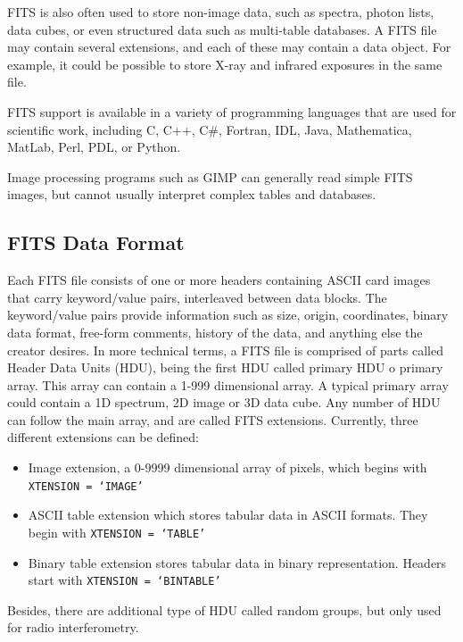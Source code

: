 FITS is also often used to store non-image data, such as spectra, photon lists, data cubes, or even structured data such as multi-table databases. A FITS file may contain several extensions, and each of these may contain a data object. For example, it
could be %
possible to store
X-ray %
and infrared exposures in the same file. 
 
FITS support is available in a variety of programming languages that are used for scientific work, including C, C++, C\#, Fortran, IDL, Java, Mathematica, MatLab, Perl, PDL, or Python. 
 
Image processing programs such as GIMP can generally read simple FITS images, but cannot usually interpret complex tables and databases.

\subsection{FITS Data Format}

Each FITS file consists of one or more headers containing ASCII card images that carry keyword/value pairs, interleaved between data blocks. The keyword/value pairs provide information such as size, origin, coordinates, binary data format, free-form comments, history of the data, and anything else the creator desires. In more technical terms, a FITS file is comprised of parts called Header Data Units (HDU), being the first HDU called primary HDU o primary array. This array can contain a 1-999 dimensional array. A typical primary array could contain a 1D spectrum, 2D image or 3D data cube. Any number of HDU can follow the main array, and are called FITS extensions. Currently, three different extensions can be defined:

\begin{itemize}
\item Image extension, a 0-9999 dimensional array of pixels, which begins with \texttt{XTENSION = `IMAGE'}
\item ASCII table extension which stores tabular data in ASCII formats. They begin with \texttt{XTENSION = `TABLE'}
\item Binary table extension stores tabular data in binary representation. Headers start with \texttt{XTENSION = `BINTABLE'}
\end{itemize}

Besides, there are additional type of HDU called random groups, but only used for radio interferometry.
      
